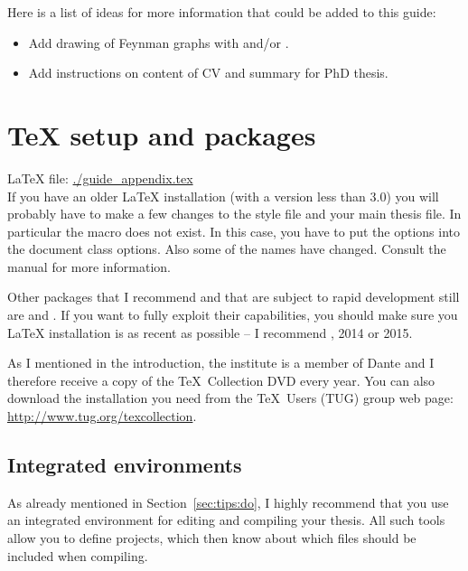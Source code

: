 Here is a list of ideas for more information that could be added to
this guide:
\begin{itemize}
\item Add drawing of Feynman graphs with  and/or
  .
\item Add instructions on content of CV and summary for PhD thesis.
\end{itemize}


\chapter{\TeX{} setup and packages}
\label{sec:app:tex}

\LaTeX{} file: \url{./guide_appendix.tex}\\[1ex]
\noindent
If you have an older \LaTeX{} installation (with a \KOMAScript{}
version less than 3.0) you will probably have to make a few changes to
the style file and your main thesis file.
In particular the  macro does not exist. In this case, you
have to put the options into the document class options. Also some of
the names have changed. Consult the \KOMAScript{} manual for more
information.

Other packages that I recommend and that are subject to rapid
development still are  and
. If you want to fully exploit their capabilities,
you should make sure you \LaTeX{} installation is as recent as
possible -- I recommend , 2014 or 2015.

As I mentioned in the introduction, the institute is a member of Dante
and I therefore receive a copy of the \TeX\ Collection DVD every
year. You can also download the installation you need from the \TeX\
Users (TUG) group web page: \url{http://www.tug.org/texcollection}.


\section{Integrated environments}
\label{sec:app:compile}

As already mentioned in Section~\ref{sec:tips:do}, I highly recommend
that you use an integrated environment for editing and compiling your
thesis. All such tools allow you to define projects, which then know
about which files should be included when compiling.

